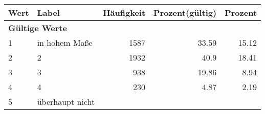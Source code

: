      \begin{longtable}{lXrrr}
     \toprule
     \textbf{Wert} & \textbf{Label} & \textbf{Häufigkeit} & \textbf{Prozent(gültig)} & \textbf{Prozent} \\
     \endhead
     \midrule
     \multicolumn{5}{l}{\textbf{Gültige Werte}}\\

     1 &
     \multicolumn{1}{X}{ in hohem Maße   } &


       \num{1587} &
       \num[round-mode=places,round-precision=2]{33,59} &
         \num[round-mode=places,round-precision=2]{15,12} \\

     2 &
     \multicolumn{1}{X}{ 2   } &


       \num{1932} &
       \num[round-mode=places,round-precision=2]{40,9} &
         \num[round-mode=places,round-precision=2]{18,41} \\

     3 &
     \multicolumn{1}{X}{ 3   } &


       \num{938} &
       \num[round-mode=places,round-precision=2]{19,86} &
         \num[round-mode=places,round-precision=2]{8,94} \\

     4 &
     \multicolumn{1}{X}{ 4   } &


       \num{230} &
       \num[round-mode=places,round-precision=2]{4,87} &
         \num[round-mode=places,round-precision=2]{2,19} \\

     5 &
     \multicolumn{1}{X}{ überhaupt nicht   } &



\end{longtable}
